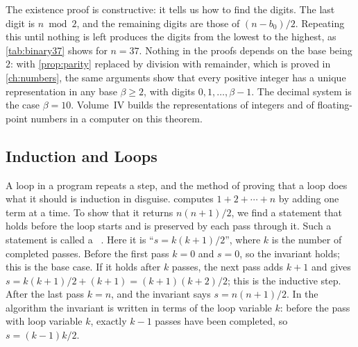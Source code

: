 The existence proof is constructive: it tells us how to find the digits. The last digit is $n\bmod2$, and the remaining digits are those of $(n-b_0)/2$. Repeating this until nothing is left produces the digits from the lowest to the highest, as \cref{tab:binary37} shows for $n=37$. Nothing in the proofs depends on the base being $2$: with \cref{prop:parity} replaced by division with remainder, which is proved in \cref{ch:numbers}, the same arguments show that every positive integer has a unique representation in any base $\beta\ge2$, with digits $0,1,\ldots,\beta-1$. The decimal system is the case $\beta=10$. Volume~IV builds the representations of integers and of floating-point numbers in a computer on this theorem.

\begin{table}
\end{table}

\subsection{Induction and Loops}

A loop in a program repeats a step, and the method of proving that a loop does what it should is induction in disguise.  computes $1+2+\cdots+n$ by adding one term at a time. To show that it returns $n(n+1)/2$, we find a statement that holds before the loop starts and is preserved by each pass through it. Such a statement is called a ~\cite{floyd1967,hoare1969,cormen2022}. Here it is ``$s=k(k+1)/2$'', where $k$ is the number of completed passes. Before the first pass $k=0$ and $s=0$, so the invariant holds; this is the base case. If it holds after $k$ passes, the next pass adds $k+1$ and gives $s=k(k+1)/2+(k+1)=(k+1)(k+2)/2$; this is the inductive step. After the last pass $k=n$, and the invariant says $s=n(n+1)/2$. In the algorithm the invariant is written in terms of the loop variable $k$: before the pass with loop variable $k$, exactly $k-1$ passes have been completed, so $s=(k-1)k/2$.

